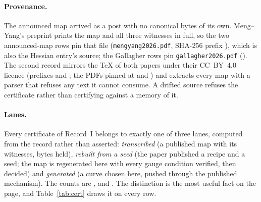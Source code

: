 \documentclass[11pt]{article}
\begin{document}
\paragraph{Provenance.} The announced map arrived as a post with no canonical bytes of its own.
Meng--Yang's preprint prints the map and all three witnesses in full, so the two announced-map
rows pin that file (\texttt{mengyang2026.pdf}, SHA-256 prefix \texttt{\MengYangSha}), which is
also the Hessian entry's source; the Gallagher rows pin \texttt{gallagher2026.pdf}
(\texttt{\GallagherSha}). The second record mirrors the TeX of both papers under their CC~BY~4.0
licence (prefixes \texttt{\GaoTexSha} and \texttt{\ChvTexSha}; the PDFs pinned at
\texttt{\GaoPdfSha} and \texttt{\ChvPdfSha}) and extracts every map with a parser that refuses any
text it cannot consume. A drifted source refuses the certificate rather than certifying against a
memory of it.

\paragraph{Lanes.} Every certificate of Record~I belongs to exactly one of three lanes, computed
from the record rather than asserted: \emph{transcribed} (a published map with its witnesses,
bytes held), \emph{rebuilt from a seed} (the paper published a recipe and a seed; the map is
regenerated here with every gauge condition verified, then decided) and \emph{generated} (a curve
chosen here, pushed through the published mechanism). The counts are \NTranscribed{},
\NReconstructed{} and \NGenerated{}. The distinction is the most useful fact on the page, and
Table~\ref{tab:cert} draws it on every row.
\end{document}

